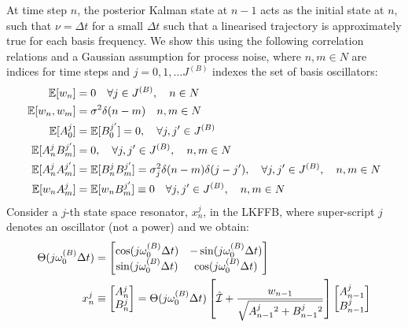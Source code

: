 At time step $n$,  the posterior Kalman state at $n-1$ acts as the initial state at $n$, such that $\nu = \Delta t$ for a small $\Delta t$ such that a linearised trajectory is approximately true for each basis frequency. We show this using the following correlation relations and a Gaussian assumption for process noise, where $n,m \in N$ are indices for time steps and $j = 0, 1, \hdots J^{(B)} $ indexes the set of basis oscillators:
 \begin{align}
 \mathbb{E}[w_n] &= 0 \quad \forall j \in J^{(B)}, \quad n \in N \\
\mathbb{E}[w_n,w_m] &= \sigma^2 \delta(n-m)  \quad n,m \in N \\
\mathbb{E}[A^j_0] &=\mathbb{E}[B^{j'}_0] = 0, \quad \forall j, j' \in J^{(B)} \\
\mathbb{E}[A^j_n B^{j'}_m] &= 0, \quad \forall j, j' \in J^{(B)}, \quad n,m \in N\\
\mathbb{E}[A^j_n A^{j'}_m] &= \mathbb{E}[B^j_n B^{j'}_m] = \sigma_j^2 \delta(n - m)\delta(j-j'), \quad \forall j, j' \in J^{(B)}, \quad n,m \in N \\
\mathbb{E}[w_n A^j_m] &= \mathbb{E}[w_n B^{j'}_m] \equiv 0  \quad \forall j, j' \in J^{(B)}, \quad n,m \in N 
\end{align}
Consider a $j$-th state space resonator, $x^j_n$, in the LKFFB, where super-script $j$ denotes an oscillator (not a power) and we obtain:
\begin{align}
\Theta(j \omega_0^{(B)} \Delta t) &= \begin{bmatrix} \cos(j \omega_0^{(B)} \Delta t) & -\sin(j \omega_0^{(B)} \Delta t) \\ \sin(j \omega_0^{(B)} \Delta t) & \cos(j \omega_0^{(B)} \Delta t) \\ \end{bmatrix} \\
x^j_n & \equiv \begin{bmatrix} A^j_{n} \\ B^j_{n} \\ \end{bmatrix} = \Theta(j \omega_0^{(B)} \Delta t) \left[\hat{\mathcal{I}} + \frac{w_{n-1}}{\sqrt{A^j_{n-1}{}^2 + B^j_{n-1}{}^2}} \right] \begin{bmatrix} A^j_{n-1} \\ B^j_{n-1} \\ \end{bmatrix} \\
\end{align}
